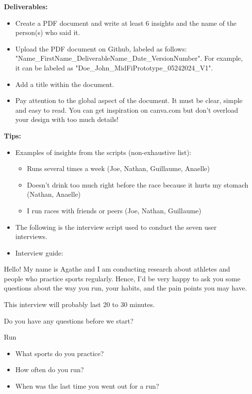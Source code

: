 \textbf{Deliverables:}

\begin{itemize}
\item Create a PDF document and write at least 6 insights and the name of the person(s) who said it.
\item Upload the PDF document on Github, labeled as follows: "Name\_FirstName\_DeliverableName\_Date\_VersionNumber". For example, it can be labeled as "Doe\_John\_MidFiPrototype\_05242024\_V1".
\item Add a title within the document.
\item Pay attention to the global aspect of the document. It must be clear, simple and easy to read. You can get inspiration on canva.com but don't overload your design with too much details!
\end{itemize}

\textbf{Tips:}

\begin{itemize}
\item Examples of insights from the scripts (non-exhaustive list):
\begin{itemize}
\item Runs several times a week (Joe, Nathan, Guillaume, Anaelle)
\item Doesn't drink too much right before the race because it hurts my stomach (Nathan, Anaelle)
\item I run races with friends or peers (Joe, Nathan, Guillaume)
\end{itemize}
\end{itemize}

\begin{itemize}
\item The following is the interview script used to conduct the seven user interviews.
\item Interview guide:
\end{itemize}

Hello! My name is Agathe and I am conducting research about athletes and people who practice sports regularly. Hence, I'd be very happy to ask you some questions about the way you run, your habits, and the pain points you may have.

This interview will probably last 20 to 30 minutes.

Do you have any questions before we start?

Run

\begin{itemize}
\item What sports do you practice?
\item How often do you run?
\item When was the last time you went out for a run?
\end{itemize}

